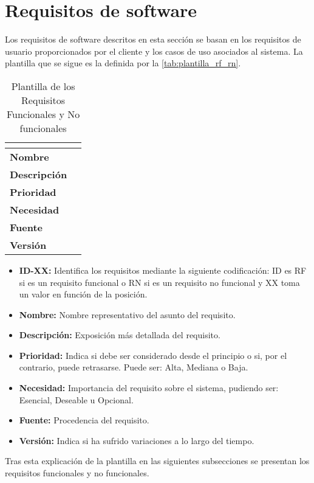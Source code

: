 \section{Requisitos de software}\label{sec:requisitos-de-software}
Los requisitos de software descritos en esta sección se basan en los requisitos de usuario proporcionados por el cliente y los casos de uso asociados al sistema. La plantilla que se sigue es la definida por la \autoref{tab:plantilla_rf_rn}.
\begin{table}[H]
	\caption{Plantilla de los Requisitos Funcionales y No funcionales}
	\label{tab:plantilla_rf_rn}
	\begin{tabular}{|l|p{}|}
		\hline
		\multicolumn{2}{|c|}{\cellcolor[HTML]{BFBFBF}{\color[HTML]{000000} \textbf{ID-XX}}} \\ \hline
		\textbf{Nombre}      &   \\ \hline
		\textbf{Descripción} &   \\ \hline
		\textbf{Prioridad}   &   \\ \hline
		\textbf{Necesidad}   &   \\ \hline
		\textbf{Fuente}      &   \\ \hline
		\textbf{Versión}     &   \\ \hline
	\end{tabular}
\end{table}
\begin{itemize}
	\item \textbf{ID-XX:} Identifica los requisitos mediante la siguiente codificación: ID es RF si es un requisito funcional o RN si es un requisito no funcional y XX toma un valor en función de la posición.
	\item \textbf{Nombre:} Nombre representativo del asunto del requisito.
	\item \textbf{Descripción:} Exposición más detallada del requisito.
	\item \textbf{Prioridad:} Indica si debe ser considerado desde el principio o si, por el contrario, puede retrasarse. Puede ser: Alta, Mediana o Baja.
	\item \textbf{Necesidad:} Importancia del requisito sobre el sistema, pudiendo ser: Esencial, Deseable u Opcional.
	\item \textbf{Fuente:} Procedencia del requisito.
	\item \textbf{Versión:} Indica si ha sufrido variaciones a lo largo del tiempo.
\end{itemize}

Tras esta explicación de la plantilla en las siguientes subsecciones se presentan los requisitos funcionales y no funcionales.
